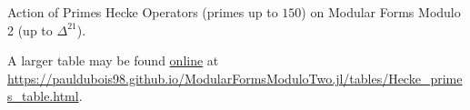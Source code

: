 \begin{center}
\begin{tabular}{|c|ccccccccccc|}
	\hline
\end{tabular}
Action of Primes Hecke Operators (primes up to $150$) on Modular Forms Modulo 2 (up to $\Delta^{21}$).
\end{center}

A larger table may be found \href{https://pauldubois98.github.io/ModularFormsModuloTwo.jl/tables/Hecke_primes_table.html}{online} at \url{https://pauldubois98.github.io/ModularFormsModuloTwo.jl/tables/Hecke_primes_table.html}.




